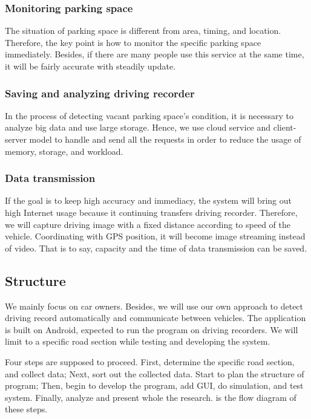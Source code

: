 \documentclass[runningheads,a4paper]{llncs}
\begin{document}
%
\subsubsection{Monitoring parking space}
%

The situation of parking space is different from area, timing, and
location. Therefore, the key point is how to monitor the specific
parking space immediately. Besides, if there are many people use this
service at the same time, it will be fairly accurate with steadily
update.

%
\subsubsection{Saving and analyzing driving recorder}
%

In the process of detecting vacant parking space's condition, it is
necessary to analyze big data and use large storage. Hence, we use cloud
service and client-server model to handle and send all the requests in
order to reduce the usage of memory, storage, and workload.

%
\subsubsection{Data transmission}
%

If the goal is to keep high accuracy and immediacy, the system will
bring out high Internet usage because it continuing transfers driving
recorder. Therefore, we will capture driving image with a fixed distance
according to speed of the vehicle. Coordinating with GPS position, it
will become image streaming instead of video. That is to say, capacity
and the time of data transmission can be saved.

%
\subsection{Structure}
%

We mainly focus on car owners. Besides, we will use our own approach to
detect driving record automatically and communicate between vehicles.
The application is built on Android, expected to run the program on
driving recorders. We will limit to a specific road section while
testing and developing the system.

Four steps are supposed to proceed. First, determine the specific road
section, and collect data; Next, sort out the collected data. Start
to plan the structure of program; Then, begin to develop the program,
add GUI, do simulation, and test system. Finally, analyze and present
whole the research.  is the flow diagram of these steps.
\end{document}
